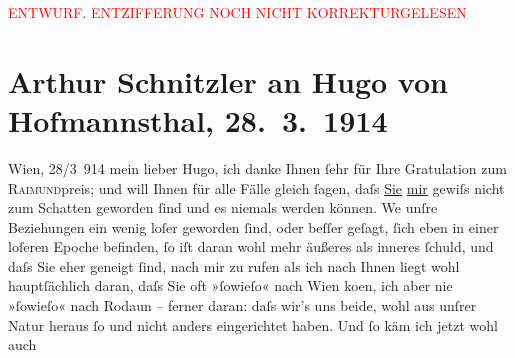 
\begin{center}
            \textcolor{red}{ENTWURF. ENTZIFFERUNG NOCH NICHT KORREKTURGELESEN}
                      \end{center}
            
               \section[Arthur Schnitzler an Hugo von Hofmannsthal, 28. 3. 1914]{ Arthur Schnitzler an Hugo von Hofmannsthal, 28. 3. 1914}\nopagebreak{}\rehead{ }\begin{ledgroupsized}[t]{13cm}\normalsize\beginnumbering{} \toendnotes[C]{\smallbreak\pagebreak[2]} 
\toendnotes[C]{\smallbreak}\pstart
           \raggedleft{}{\pb}Wien, 28/3 914\pend
           \pstart
           mein lieber Hugo, ich danke Ihnen ſehr für Ihre Gratulation zum \textsc{Raimund}preis; und will Ihnen für alle Fälle gleich
               ſagen, daſs \uline{Sie}{ }\uline{mir} gewiſs nicht zum Schatten geworden ſind und es
               niemals werden können. We{\geminationn} unſre Beziehungen ein wenig
               loſer geworden ſind, oder beſſer geſagt, ſich \introOben{}eben\introOben{} in einer
               loſeren Epoche befinden, ſo iſt daran wohl mehr äußeres als inneres ſchuld,  und
               daſs Sie eher geneigt ſind, nach mir zu rufen als ich nach Ihnen liegt wohl
               hauptſächlich daran, daſs Sie oft »ſowieſo« nach Wien
                  ko{\geminationm}en, ich aber nie »ſowieſo« nach Rodaun – ferner daran: daſs wir’s uns beide, wohl aus unſrer
               Natur heraus ſo und nicht anders eingerichtet haben. Und ſo käm ich jetzt wohl auch

\end{ledgroupsized}
